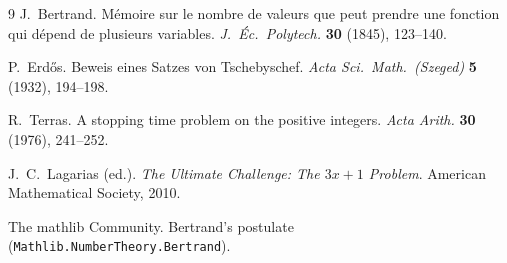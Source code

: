 \documentclass[11pt,a4paper]{article}
\theoremstyle{definition}
\theoremstyle{remark}
\begin{document}
\begin{thebibliography}{9}
J.~Bertrand.
\newblock M\'emoire sur le nombre de valeurs que peut prendre une fonction
qui d\'epend de plusieurs variables.
\newblock \emph{J.\ \'Ec.\ Polytech.} \textbf{30} (1845), 123--140.

P.~Erd\H{o}s.
\newblock Beweis eines Satzes von Tschebyschef.
\newblock \emph{Acta Sci.\ Math.\ (Szeged)} \textbf{5} (1932), 194--198.

R.~Terras.
\newblock A stopping time problem on the positive integers.
\newblock \emph{Acta Arith.} \textbf{30} (1976), 241--252.

J.~C.~Lagarias (ed.).
\newblock \emph{The Ultimate Challenge: The $3x+1$ Problem}.
\newblock American Mathematical Society, 2010.

The mathlib Community.
\newblock Bertrand's postulate
(\texttt{Mathlib.NumberTheory.Bertrand}).
\end{thebibliography}
\end{document}
